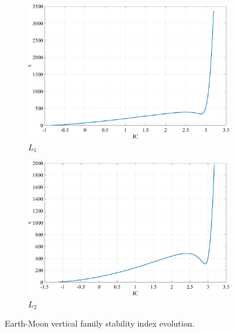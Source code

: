 \begin{figure}[H]
    \begin{subfigure}[h]{0.4\linewidth}
        \includegraphics[width=\textwidth]{figures/L1VerticalStability.pdf}
        \caption{$L_{1}$}
    \end{subfigure}
    \hfill
    \begin{subfigure}[h]{0.4\linewidth}
        \includegraphics[width=\textwidth]{figures/L2VerticalStability.pdf}
        \caption{$L_{2}$}
    \end{subfigure}
    \caption{Earth-Moon vertical family stability index evolution.}
    \label{fig:verticalStability}
\end{figure}
